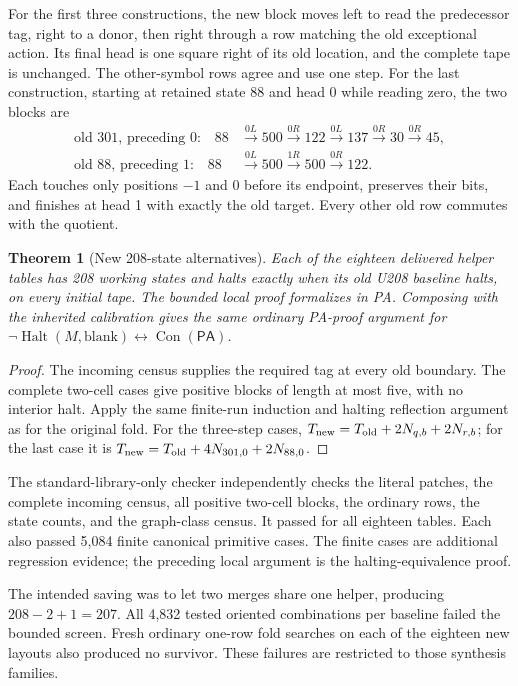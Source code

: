 \documentclass[11pt,a4paper]{article}
\newtheorem{theorem}{Theorem}[section]
\newcommand{\PA}{\mathsf{PA}}
\newcommand{\Con}{\operatorname{Con}}
\newcommand{\Halt}{\operatorname{Halt}}
\begin{document}
For the first three constructions, the new block moves left to read the
predecessor tag, right to a donor, then right through a row matching the old
exceptional action. Its final head is one square right of its old location,
and the complete tape is unchanged. The other-symbol rows agree and use
one step. For the last construction, starting at retained state 88 and
head 0 while reading zero, the two blocks are
\begin{align*}
\text{old 301, preceding 0:}\quad
88&\xrightarrow{0L}500\xrightarrow{0R}122\xrightarrow{0L}137
  \xrightarrow{0R}30\xrightarrow{0R}45,\\
\text{old 88, preceding 1:}\quad
88&\xrightarrow{0L}500\xrightarrow{1R}500\xrightarrow{0R}122.
\end{align*}
Each touches only positions $-1$ and 0 before its endpoint, preserves their
bits, and finishes at head 1 with exactly the old target. Every other old
row commutes with the quotient.

\begin{theorem}[New 208-state alternatives]
Each of the eighteen delivered helper tables has 208 working states and
halts exactly when its old U208 baseline halts, on every initial tape.
The bounded local proof formalizes in PA. Composing with the inherited
calibration gives the same ordinary PA-proof argument for
$\neg\Halt(M,\mathrm{blank})\leftrightarrow\Con(\PA)$.
\end{theorem}
\begin{proof}
The incoming census supplies the required tag at every old boundary. The
complete two-cell cases give positive blocks of length at most five,
with no interior halt. Apply the same finite-run induction and halting
reflection argument as for the original fold. For the three-step cases,
$T_{\rm new}=T_{\rm old}+2N_{q,b}+2N_{r,b}$; for the last case it is
$T_{\rm new}=T_{\rm old}+4N_{301,0}+2N_{88,0}$.
\end{proof}

The standard-library-only checker
 independently checks the literal patches,
the complete incoming census, all positive two-cell blocks, the ordinary
rows, the state counts, and the graph-class census. It passed for all
eighteen tables. Each also passed 5,084 finite canonical primitive cases.
The finite cases are additional regression evidence; the preceding local
argument is the halting-equivalence proof.

The intended saving was to let two merges share one helper, producing
$208-2+1=207$. All 4,832 tested oriented combinations per baseline failed
the bounded screen. Fresh ordinary one-row fold searches on each of the
eighteen new layouts also produced no survivor. These failures are restricted
to those synthesis families.
\end{document}
